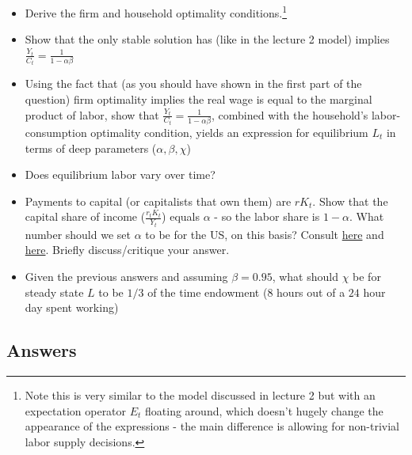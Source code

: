 \documentclass[authoryear,11pt]{elsarticle}
\begin{document}
\begin{itemize}
\item	Derive the firm and household optimality conditions.\footnote{Note this is very similar to the model discussed in lecture 2 but with an expectation operator $E_{t}$ floating around, which doesn't hugely change the appearance of the expressions - the main difference is allowing for non-trivial labor supply decisions.}
\item	Show that the only stable solution has (like in the lecture 2 model) implies $\frac{Y_{t}}{C_{t}} = \frac{1}{1-\alpha \beta}$
\item	Using the fact that (as you should have shown in the first part of the question) firm optimality implies the real wage is equal to the marginal product of labor, show that $\frac{Y_{t}}{C_{t}} = \frac{1}{1-\alpha \beta}$, combined with the household's labor-consumption optimality condition, yields an expression for equilibrium $L_{t}$ in terms of deep parameters ($\alpha, \beta, \chi$)
\item	Does equilibrium labor vary over time?
\item	Payments to capital (or capitalists that own them) are $r K_{t}$. Show that the capital share of income ($\frac{r_{t} K_{t}}{Y_{t}}$) equals $\alpha$ - so the labor share is $1-\alpha$. What number should we set $\alpha$ to be for the US, on this basis? Consult \href{https://www.bls.gov/opub/mlr/2017/article/estimating-the-us-labor-share.htm}{here} and \href{https://fred.stlouisfed.org/series/PRS85006173}{here}. Briefly discuss/critique your answer.
\item	Given the previous answers and assuming $\beta = 0.95$, what should $\chi$ be for steady state $L$ to be $1/3$ of the time endowment ($8$ hours out of a $24$ hour day spent working)
\end{itemize}


\subsection*{Answers}
\end{document}
